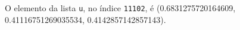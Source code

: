 \documentclass[12pt,varwidth=16cm,border=1pt]{standalone}
\begin{document}
O elemento da lista \verb+u+, no índice \verb+11102+, é (0.6831275720164609, 0.41116751269035534, 0.4142857142857143).

\questiomfalse
\end{document}
